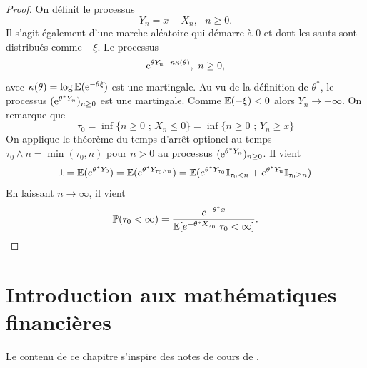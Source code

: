 \begin{proof}
On définit le processus 
$$
Y_n = x - X_n,\text{ }n\geq0.
$$
Il s'agit également d'une marche aléatoire qui démarre à $0$ et dont les sauts sont distribués comme $-\xi$. Le processus 
$$
\mathrm{e}^{\theta Y_n - n\kappa(\theta)},\text{ }n\geq0,
$$
avec $\kappa(\theta) = \log\mathbb{E}(\mathrm{e}^{-\theta\xi})$ est une martingale. Au vu de la définition de $\theta^\ast$, le processus $(\mathrm{e}^{\theta^\ast Y_n})_{n\geq 0}$ est une martingale. Comme $\mathbb{E}(-\xi) <0$ alors $Y_n\rightarrow -\infty$. On remarque que 
$$
\tau_0 = \inf\{n\geq0\text{ ; }X_n\leq0\} = \inf\{n\geq0\text{ ; }Y_n\geq x\}
$$ 
On applique le théorème du temps d'arrêt optionel au temps $\tau_0\land n = \min(\tau_0,n)$ pour $n>0$ au processus $(\mathrm{e}^{\theta^\ast Y_n})_{n\geq 0}$. Il vient 
$$
1 = \mathbb{E}(e^{\theta^{\ast}Y_0}) = \mathbb{E}(e^{\theta^{\ast}Y_{\tau_0\land n}}) = \mathbb{E}(e^{\theta^\ast Y_{\tau_0}}\mathbb{I}_{\tau_0< n} + e^{\theta^\ast Y_n}\mathbb{I}_{\tau_0\geq n})
$$
En laissant $n\rightarrow \infty$, il vient 
$$
\mathbb{P}(\tau_0<\infty) = \frac{e^{-\theta^\ast x}}{\mathbb{E}[e^{-\theta^\ast X_{\tau_0}}|\tau_0 <\infty]}.
$$
\end{proof}
\section{Introduction aux mathématiques financières}\label{sec:intro_math_fi}
Le contenu de ce chapitre s'inspire des notes de cours de \citet{Tankov2010}.

